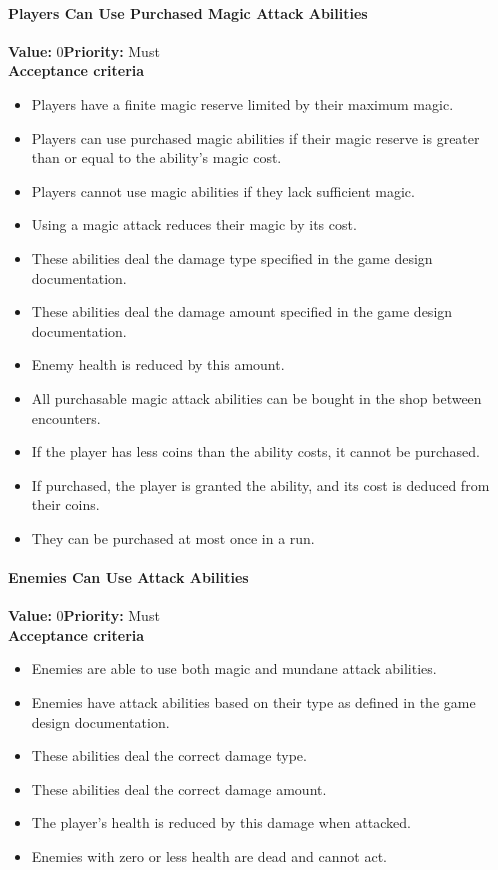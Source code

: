 \paragraph{Players Can Use Purchased Magic Attack Abilities}
\textbf{Value:} 0\quad \textbf{Priority:} Must\\
\textbf{Acceptance criteria}
\begin{itemize}
  \item Players have a finite magic reserve limited by their maximum magic.
  \item Players can use purchased magic abilities if their magic reserve is greater than or equal to the ability's magic cost. 
  \item Players cannot use magic abilities if they lack sufficient magic.
  \item Using a magic attack reduces their magic by its cost.
  \item These abilities deal the damage type specified in the game design documentation.
  \item These abilities deal the damage amount specified in the game design documentation.
  \item Enemy health is reduced by this amount.
  \item All purchasable magic attack abilities can be bought in the shop between encounters.
  \item If the player has less coins than the ability costs, it cannot be purchased. 
  \item If purchased, the player is granted the ability, and its cost is deduced from their coins. 
  \item They can be purchased at most once in a run. 
\end{itemize}

\paragraph{Enemies Can Use Attack Abilities}
\textbf{Value:} 0\quad \textbf{Priority:} Must\\
\textbf{Acceptance criteria}
\begin{itemize}
  \item Enemies are able to use both magic and mundane attack abilities.
  \item Enemies have attack abilities based on their type as defined in the game design documentation.
  \item These abilities deal the correct damage type.
  \item These abilities deal the correct damage amount.
  \item The player's health is reduced by this damage when attacked.
  \item Enemies with zero or less health are dead and cannot act.
\end{itemize}

